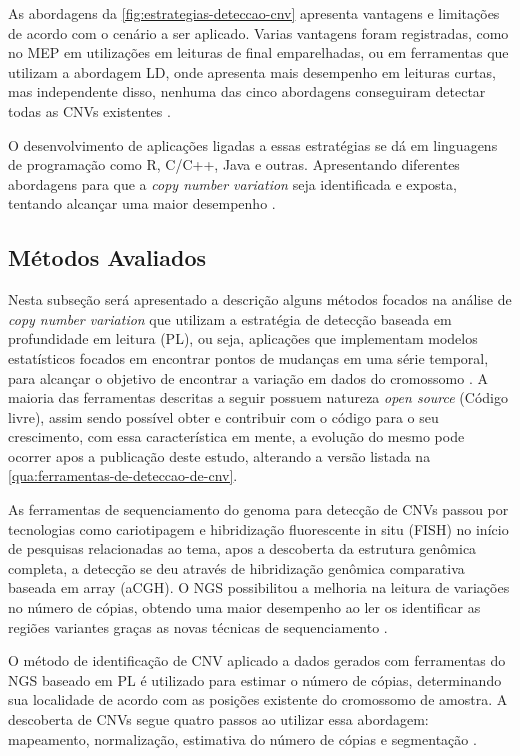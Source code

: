 As abordagens da \autoref{fig:estrategias-deteccao-cnv} apresenta vantagens e limitações de acordo com o cenário a ser aplicado. Varias vantagens foram registradas, como no MEP em utilizações em leituras de final emparelhadas, ou em ferramentas que utilizam a abordagem LD, onde apresenta mais desempenho em leituras curtas, mas independente disso, nenhuma das cinco abordagens conseguiram detectar todas as CNVs existentes \cite{Zhao2013}.

O desenvolvimento de aplicações ligadas a essas estratégias se dá em linguagens de programação como R, C/C++, Java e outras. Apresentando diferentes abordagens para que a \textit{copy number variation} seja identificada e exposta, tentando alcançar uma maior desempenho \cite{Zhao2013}.

\subsection{Métodos Avaliados} 

Nesta subseção será apresentado a descrição alguns métodos focados na análise de \textit{copy number variation} que utilizam a estratégia de detecção baseada em profundidade em leitura (PL), ou seja, aplicações que implementam modelos estatísticos focados em encontrar pontos de mudanças em uma série temporal, para alcançar o objetivo de encontrar a variação em dados do cromossomo \cite{Zhao2013}. A maioria das ferramentas descritas a seguir possuem natureza \textit{open source} (Código livre), assim sendo possível obter e contribuir com o código para o seu crescimento, com essa característica em mente, a evolução do mesmo pode ocorrer apos a publicação deste estudo, alterando a versão listada na \autoref{qua:ferramentas-de-deteccao-de-cnv}.

As ferramentas de sequenciamento do genoma para detecção de CNVs passou por tecnologias como cariotipagem e hibridização fluorescente in situ (FISH) no início de pesquisas relacionadas ao tema, apos a descoberta da estrutura genômica completa, a detecção se deu através de hibridização genômica comparativa baseada em array (aCGH). O NGS possibilitou a melhoria na leitura de variações no número de cópias, obtendo uma maior desempenho ao ler os identificar as regiões variantes graças as novas técnicas de sequenciamento \cite{Zhao2013,Liu2013}.

O método de identificação de CNV aplicado a dados gerados com ferramentas do NGS baseado em PL é utilizado para estimar o número de cópias, determinando sua localidade de acordo com as posições existente do cromossomo de amostra. A descoberta de CNVs segue quatro passos ao utilizar essa abordagem: mapeamento, normalização, estimativa do número de cópias e segmentação \cite{Zhao2013}.

